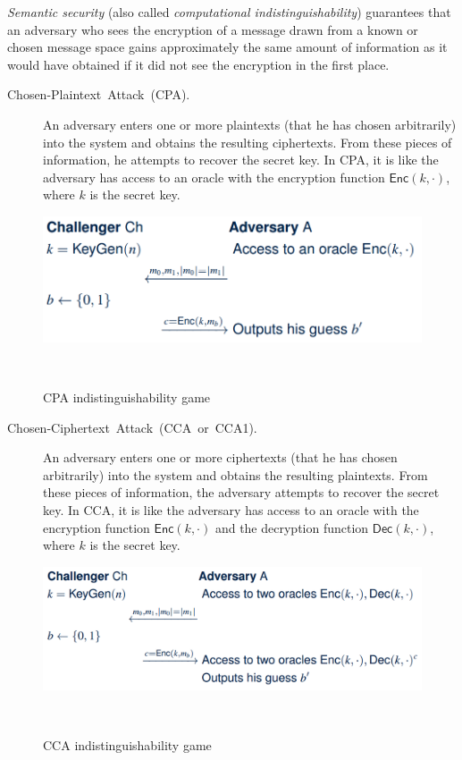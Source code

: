 \documentclass[11pt]{article}
\theoremstyle{plain}
\begin{document}
\emph{Semantic security} (also called \emph{computational indistinguishability})
guarantees that an adversary who sees the encryption of a message
\textendash{} drawn from a known or chosen message space \textendash{}
gains approximately the same amount of information as it would have
obtained if it did not see the encryption in the first place.
\begin{description}
	\item [{Chosen-Plaintext~Attack~(CPA).}] An adversary enters one or more
	plaintexts (that he has chosen arbitrarily) into the system and obtains
	the resulting ciphertexts. From these pieces of information, he attempts
	to recover the secret key. In CPA, it is like the adversary has access
	to an oracle with the encryption function $\mathsf{Enc}(k,\cdot)$,
	where $k$ is the secret key.
\end{description}
\begin{figure}
	\begin{description}
		\item [{\includegraphics[scale=0.55]{cpa-game}}]~
	\end{description}
	\caption{CPA indistinguishability game}
	\label{fig:cpa-game}
\end{figure}

\begin{description}
	\item [{Chosen-Ciphertext~Attack~(CCA~or~CCA1).}] An adversary enters
	one or more ciphertexts (that he has chosen arbitrarily) into the
	system and obtains the resulting plaintexts. From these pieces of
	information, the adversary attempts to recover the secret key. In
	CCA, it is like the adversary has access to an oracle with the encryption
	function $\mathsf{Enc}(k,\cdot)$ and the decryption function $\mathsf{Dec}(k,\cdot)$,
	where $k$ is the secret key.
\end{description}
\begin{figure}
	\begin{description}
		\item [{\includegraphics[scale=0.55]{cca-game}}]~
	\end{description}
	\caption{CCA indistinguishability game}
	\label{fig:cca-game}
\end{figure}
\end{document}

